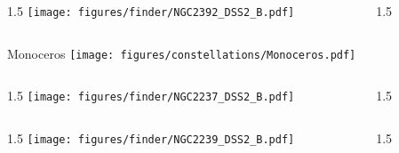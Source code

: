 \documentclass[final]{beamer}
\newlength{\colwidth}
\begin{document}

\begin{frame}[t]{}
  \begin{columns}[T]
    \begin{column}{1.5\colwidth}
      \centering
      \texttt{[image: figures/finder/NGC2392\_DSS2\_B.pdf]}
    \end{column}
    \begin{column}{1.5\colwidth}
      \Large
      
    \end{column}
  \end{columns}
  \vspace{\fill}
\end{frame}


\begin{frame}[t]{\LARGE Monoceros}
  \centering
  \texttt{[image: figures/constellations/Monoceros.pdf]}
\end{frame}


\begin{frame}[t]{}
  \begin{columns}[T]
    \begin{column}{1.5\colwidth}
      \centering
      \texttt{[image: figures/finder/NGC2237\_DSS2\_B.pdf]}
    \end{column}
    \begin{column}{1.5\colwidth}
      \Large
      
    \end{column}
  \end{columns}
  \vspace{\fill}
  \begin{columns}[T]
    \begin{column}{1.5\colwidth}
      \centering
      \texttt{[image: figures/finder/NGC2239\_DSS2\_B.pdf]}
    \end{column}
    \begin{column}{1.5\colwidth}
      \Large
      
    \end{column}
  \end{columns}
\end{frame}
\end{document}
